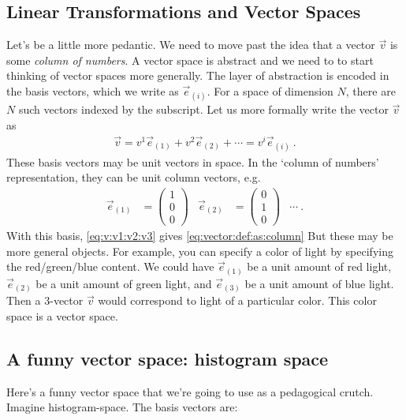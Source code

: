 \subsection{Linear Transformations and Vector Spaces}

Let’s be a little more pedantic. We need to move past the idea that a vector $\vec{v}$ is some \emph{column of numbers}. A vector space is abstract and we need to to start thinking of vector spaces more generally. The layer of abstraction is encoded in the basis vectors, which we write as $\vec{e}_{(i)}$. For a space of dimension $N$, there are $N$ such vectors indexed by the subscript. Let us more formally write the vector $\vec{v}$ as
\begin{align}
  \vec{v} = 
  v^1 \vec{e}_{(1)}
  +
  v^2 \vec{e}_{(2)} + \cdots
  = v^i \vec{e}_{(i)} \ .
  \label{eq:v:v1:v2:v3}
\end{align}
These basis vectors may be unit vectors in space. In the `column of numbers' representation, they can be unit column vectors, e.g.
\begin{align}
  \vec{e}_{(1)}
  &= 
  \begin{pmatrix}
  1 \\ 0 \\ 0
  \end{pmatrix}
  &
    \vec{e}_{(2)}
  &= 
  \begin{pmatrix}
  0 \\ 1 \\ 0
  \end{pmatrix}
  &
  \cdots \ .
\end{align}
With this basis, \eqref{eq:v:v1:v2:v3} gives \eqref{eq:vector:def:as:column}
But these may be more general objects. For example, you can specify a color of light by specifying the red/green/blue content. We could have $\vec{e}_{(1)}$ be a unit amount of red light, $\vec{e}_{(2)}$ be a unit amount of green light, and $\vec{e}_{(3)}$ be a unit amount of blue light. Then a 3-vector $\vec{v}$ would correspond to light of a particular color. This color space is a vector space.




\subsection{A funny vector space: histogram space}

Here’s a funny vector space that we’re going to use as a pedagogical crutch. Imagine histogram-space. The basis vectors are:

